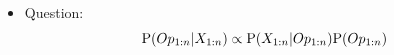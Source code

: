 \begin{itemize}
    \item Question:
$$\mathrm{P}(Op_{1:n} | X_{1:n}) \propto \mathrm{P}(X_{1:n}|Op_{1:n})\mathrm{P}(Op_{1:n})$$
\end{itemize}


